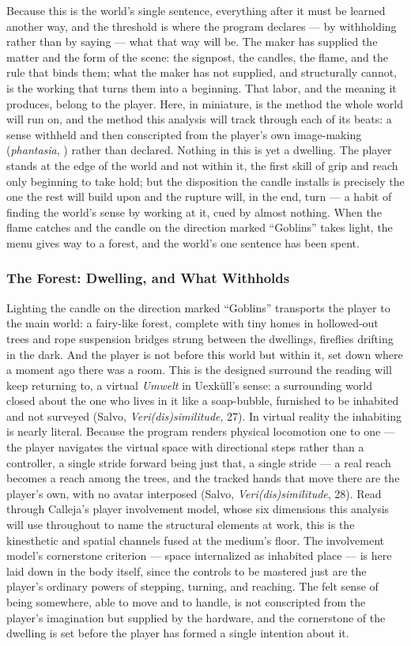 Because this is the world's single sentence, everything after it must be learned another way, and the threshold is where the program declares — by withholding rather than by saying — what that way will be. The maker has supplied the matter and the form of the scene: the signpost, the candles, the flame, and the rule that binds them; what the maker has not supplied, and structurally cannot, is the working that turns them into a beginning. That labor, and the meaning it produces, belong to the player. Here, in miniature, is the method the whole world will run on, and the method this analysis will track through each of its beats: a sense withheld and then conscripted from the player's own image-making (\textit{phantasia}, ) rather than declared. Nothing in this is yet a dwelling. The player stands at the edge of the world and not within it, the first skill of grip and reach only beginning to take hold; but the disposition the candle installs is precisely the one the rest will build upon and the rupture will, in the end, turn — a habit of finding the world's sense by working at it, cued by almost nothing. When the flame catches and the candle on the direction marked ``Goblins'' takes light, the menu gives way to a forest, and the world's one sentence has been spent.

\subsubsection*{The Forest: Dwelling, and What Withholds}

Lighting the candle on the direction marked ``Goblins'' transports the player to the main world: a fairy-like forest, complete with tiny homes in hollowed-out trees and rope suspension bridges strung between the dwellings, fireflies drifting in the dark. And the player is not before this world but within it, set down where a moment ago there was a room. This is the designed surround the reading will keep returning to, a virtual \textit{Umwelt} in Uexküll's sense: a surrounding world closed about the one who lives in it like a soap-bubble, furnished to be inhabited and not surveyed (Salvo, \textit{Veri(dis)similitude}, 27). In virtual reality the inhabiting is nearly literal. Because the program renders physical locomotion one to one — the player navigates the virtual space with directional steps rather than a controller, a single stride forward being just that, a single stride — a real reach becomes a reach among the trees, and the tracked hands that move there are the player's own, with no avatar interposed (Salvo, \textit{Veri(dis)similitude}, 28). Read through Calleja's player involvement model, whose six dimensions this analysis will use throughout to name the structural elements at work, this is the kinesthetic and spatial channels fused at the medium's floor. The involvement model's cornerstone criterion — space internalized as inhabited place — is here laid down in the body itself, since the controls to be mastered just are the player's ordinary powers of stepping, turning, and reaching. The felt sense of being somewhere, able to move and to handle, is not conscripted from the player's imagination but supplied by the hardware, and the cornerstone of the dwelling is set before the player has formed a single intention about it.

